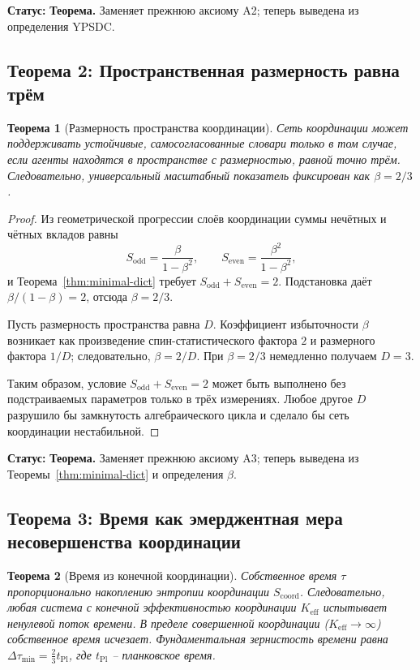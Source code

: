 \documentclass[12pt,a4paper]{article}
\newtheorem{theorem}{Теорема}[section]
\begin{document}
	\textbf{Статус:} \textbf{Теорема.} Заменяет прежнюю аксиому A2; теперь выведена из определения YPSDC.
	
	\subsection{Теорема 2: Пространственная размерность равна трём}
	
	\begin{theorem}[Размерность пространства координации]
		\label{thm:dimension}
		Сеть координации может поддерживать устойчивые, самосогласованные словари только в том случае, если агенты находятся в пространстве с размерностью, равной точно трём. Следовательно, универсальный масштабный показатель фиксирован как \(\beta = 2/3\).
	\end{theorem}
	
	\begin{proof}
		Из геометрической прогрессии слоёв координации суммы нечётных и чётных вкладов равны
		\[
		S_{\mathrm{odd}} = \frac{\beta}{1-\beta^2}, \qquad
		S_{\mathrm{even}} = \frac{\beta^2}{1-\beta^2},
		\]
		и Теорема~\ref{thm:minimal-dict} требует \(S_{\mathrm{odd}} + S_{\mathrm{even}} = 2\).
		Подстановка даёт \(\beta/(1-\beta) = 2\), отсюда \(\beta = 2/3\).
		
		Пусть размерность пространства равна \(D\). Коэффициент избыточности \(\beta\) возникает как произведение спин-статистического фактора \(2\) и размерного фактора \(1/D\); следовательно, \(\beta = 2/D\). При \(\beta = 2/3\) немедленно получаем \(D = 3\).
		
		Таким образом, условие \(S_{\mathrm{odd}} + S_{\mathrm{even}} = 2\) может быть выполнено без подстраиваемых параметров только в трёх измерениях. Любое другое \(D\) разрушило бы замкнутость алгебраического цикла и сделало бы сеть координации нестабильной.
	\end{proof}
	
	\textbf{Статус:} \textbf{Теорема.} Заменяет прежнюю аксиому A3; теперь выведена из Теоремы~\ref{thm:minimal-dict} и определения \(\beta\).
	
	\subsection{Теорема 3: Время как эмерджентная мера несовершенства координации}
	
	\begin{theorem}[Время из конечной координации]
		\label{thm:time}
		Собственное время \(\tau\) пропорционально накоплению энтропии координации \(S_{\mathrm{coord}}\). Следовательно, любая система с конечной эффективностью координации \(K_{\mathrm{eff}}\) испытывает ненулевой поток времени. В пределе совершенной координации (\(K_{\mathrm{eff}} \to \infty\)) собственное время исчезает. Фундаментальная зернистость времени равна \(\Delta \tau_{\min} = \frac{2}{3} t_{\mathrm{Pl}}\), где \(t_{\mathrm{Pl}}\) – планковское время.
	\end{theorem}
	
\end{document}
